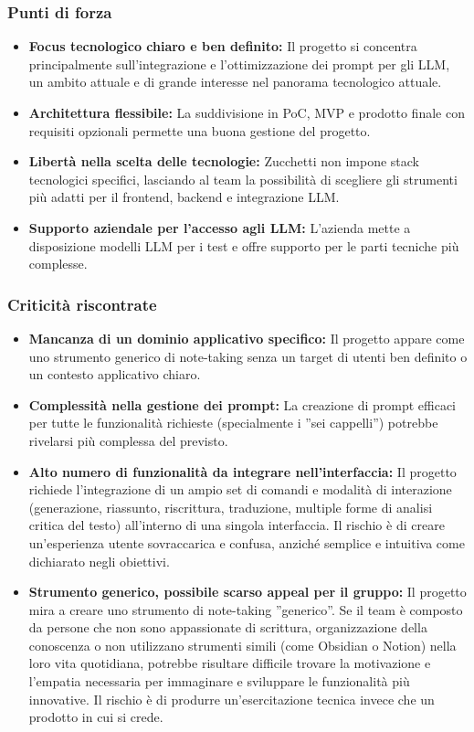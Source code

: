 \documentclass{article}
\begin{document}
	\subsubsection{Punti di forza}
	\begin{itemize}
		\item \textbf{Focus tecnologico chiaro e ben definito:} Il progetto si concentra principalmente sull'integrazione e l'ottimizzazione dei prompt per gli LLM, un ambito attuale e di grande interesse nel panorama tecnologico attuale.
		\item \textbf{Architettura flessibile:} La suddivisione in PoC, MVP e prodotto finale con requisiti opzionali permette una buona gestione del progetto.
		\item \textbf{Libertà nella scelta delle tecnologie:}  Zucchetti non impone stack tecnologici specifici, lasciando al team la possibilità di scegliere gli strumenti più adatti per il frontend, backend e integrazione LLM.
        \item \textbf{Supporto aziendale per l'accesso agli LLM:} L'azienda mette a disposizione modelli LLM per i test e offre supporto per le parti tecniche più complesse.
    \end{itemize}
	
	\subsubsection{Criticità riscontrate}
	\begin{itemize}
		\item \textbf{Mancanza di un dominio applicativo specifico:} Il progetto appare come uno strumento generico di note-taking senza un target di utenti ben definito o un contesto applicativo chiaro.
		\item \textbf{Complessità nella gestione dei prompt:} La creazione di prompt efficaci per tutte le funzionalità richieste (specialmente i ''sei cappelli'') potrebbe rivelarsi più complessa del previsto.
		\item \textbf{Alto numero di funzionalità da integrare nell'interfaccia:}  Il progetto richiede l'integrazione di un ampio set di comandi e modalità di interazione (generazione, riassunto, riscrittura, traduzione, multiple forme di analisi critica del testo) all'interno di una singola interfaccia. Il rischio è di creare un'esperienza utente sovraccarica e confusa, anziché semplice e intuitiva come dichiarato negli obiettivi.
        \item \textbf{Strumento generico, possibile scarso appeal per il gruppo:} Il progetto mira a creare uno strumento di note-taking ''generico''. Se il team è composto da persone che non sono appassionate di scrittura, organizzazione della conoscenza o non utilizzano strumenti simili (come Obsidian o Notion) nella loro vita quotidiana, potrebbe risultare difficile trovare la motivazione e l'empatia necessaria per immaginare e sviluppare le funzionalità più innovative. Il rischio è di produrre un'esercitazione tecnica invece che un prodotto in cui si crede.
    \end{itemize}
	
\end{document}
